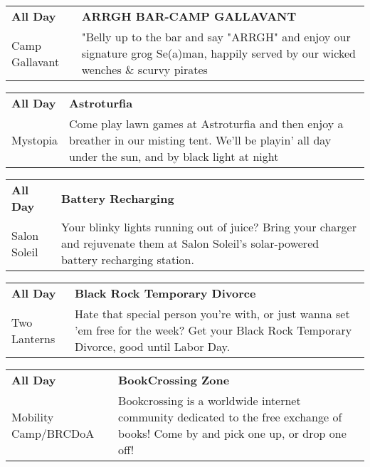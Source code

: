 \begin{tabular}{ p{1in} p{2.2in} }
    \textbf{All Day} & \textbf{ARRGH BAR-CAMP GALLAVANT} \\
    Camp Gallavant \newline  & "Belly up to the bar and say "ARRGH" and enjoy our signature grog Se(a)man, happily served by our wicked wenches \& scurvy pirates \\
    \hline 
\end{tabular}
    
\begin{tabular}{ p{1in} p{2.2in} }
    \textbf{All Day} & \textbf{Astroturfia} \\
    Mystopia \newline  & Come play lawn games at Astroturfia and then enjoy a breather in our misting tent. We'll be playin' all day under the sun, and by black light at night \\
    \hline 
\end{tabular}
    
\begin{tabular}{ p{1in} p{2.2in} }
    \textbf{All Day} & \textbf{Battery Recharging} \\
    Salon Soleil \newline  & Your blinky lights running out of juice? Bring your charger and rejuvenate them at Salon Soleil's solar-powered battery recharging station. \\
    \hline 
\end{tabular}
    
\begin{tabular}{ p{1in} p{2.2in} }
    \textbf{All Day} & \textbf{Black Rock Temporary Divorce} \\
    Two Lanterns \newline  & Hate that special person you're with, or just wanna set 'em free for the
week? Get your Black Rock Temporary Divorce, good until Labor Day. \\
    \hline 
\end{tabular}
    
\begin{tabular}{ p{1in} p{2.2in} }
    \textbf{All Day} & \textbf{BookCrossing Zone} \\
    Mobility Camp/BRCDoA \newline  & Bookcrossing is a worldwide internet community dedicated to the free exchange of books! Come by and pick one up, or drop one off! \\
    \hline 
\end{tabular}
    
